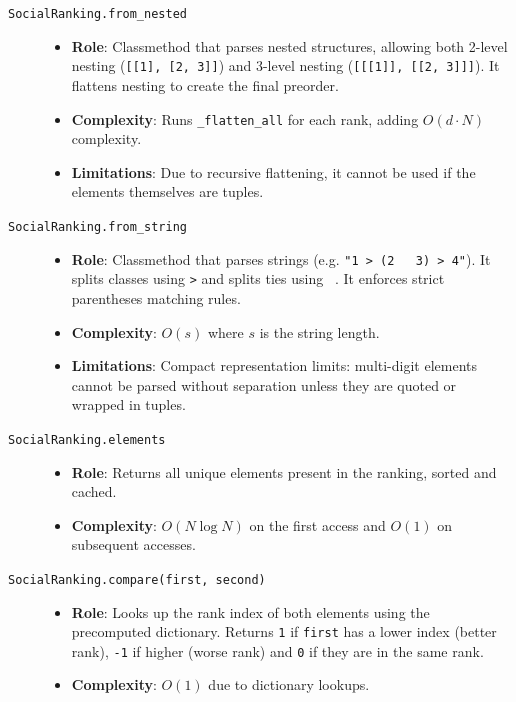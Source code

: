 \documentclass[11pt]{article}
\newcommand{\pathitem}[1]{\texttt{#1}}
\begin{document}
\begin{description}
  \item[\pathitem{SocialRanking.from\_nested}]
  \begin{itemize}
    \item \textbf{Role}: Classmethod that parses nested structures, allowing both 2-level nesting (\texttt{[[1], [2, 3]]}) and 3-level nesting (\texttt{[[[1]], [[2, 3]]]}). It flattens nesting to create the final preorder.
    \item \textbf{Complexity}: Runs \pathitem{\_flatten\_all} for each rank, adding $O(d \cdot N)$ complexity.
    \item \textbf{Limitations}: Due to recursive flattening, it cannot be used if the elements themselves are tuples.
  \end{itemize}

  \item[\pathitem{SocialRanking.from\_string}]
  \begin{itemize}
    \item \textbf{Role}: Classmethod that parses strings (e.g. \texttt{"1 > (2 \string~ 3) > 4"}). It splits classes using \texttt{>} and splits ties using \texttt{\string~}. It enforces strict parentheses matching rules.
    \item \textbf{Complexity}: $O(s)$ where $s$ is the string length.
    \item \textbf{Limitations}: Compact representation limits: multi-digit elements cannot be parsed without separation unless they are quoted or wrapped in tuples.
  \end{itemize}

  \item[\pathitem{SocialRanking.elements}]
  \begin{itemize}
    \item \textbf{Role}: Returns all unique elements present in the ranking, sorted and cached.
    \item \textbf{Complexity}: $O(N \log N)$ on the first access and $O(1)$ on subsequent accesses.
  \end{itemize}

  \item[\pathitem{SocialRanking.compare(first, second)}]
  \begin{itemize}
    \item \textbf{Role}: Looks up the rank index of both elements using the precomputed dictionary. Returns \texttt{1} if \texttt{first} has a lower index (better rank), \texttt{-1} if higher (worse rank) and \texttt{0} if they are in the same rank.
    \item \textbf{Complexity}: $O(1)$ due to dictionary lookups.
  \end{itemize}


\end{description}
\end{document}
